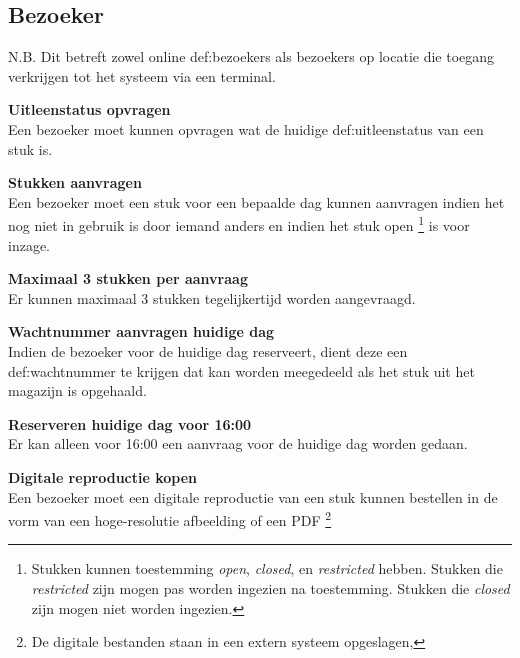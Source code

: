 \documentclass[a4paper,titlepage]{report}
\makeatletter
\def\nameddisplayedlabel#1#2{
  \label{#1}
  \begingroup
   \def\@currentlabel{#2}%
   \label{#1:name}\endgroup
   \textbf{#2}\hfill\\
}
\makeatother
\begin{document}
    \subsection{Bezoeker}
      N.B. Dit betreft zowel online \glspl{def:bezoeker} als bezoekers op locatie die
      toegang verkrijgen tot het systeem via een terminal.
      \begin{enumerate}[label={[F:\arabic*]}]
          \item\nameddisplayedlabel{f:status-opvragen}{Uitleenstatus opvragen}
            Een bezoeker moet kunnen opvragen wat de huidige
            \gls{def:uitleenstatus} van een stuk is.
          \item\nameddisplayedlabel{f:aanvragen}{Stukken aanvragen}
            Een bezoeker moet een stuk voor een bepaalde dag kunnen aanvragen
            indien het nog niet in gebruik is door iemand anders en indien het
            stuk open \footnote{Stukken kunnen toestemming \emph{open},
            \emph{closed}, en \emph{restricted} hebben. Stukken die
            \emph{restricted} zijn mogen pas worden ingezien na toestemming.
            Stukken die \emph{closed} zijn mogen niet worden ingezien.} is voor
            inzage. 
            \begin{enumerate}[label={[F:\arabic{enumi}\alph*]}]
              \item\nameddisplayedlabel{f:max-aantal-stukken}{Maximaal 3 stukken
              per aanvraag}
                Er kunnen maximaal 3 stukken tegelijkertijd worden aangevraagd.
              \item\nameddisplayedlabel{f:wachtnummertje}{Wachtnummer aanvragen
              huidige dag}
                Indien de bezoeker voor de huidige dag reserveert, dient deze
                een \gls{def:wachtnummer} te krijgen dat kan worden meegedeeld als
                het stuk uit het magazijn is opgehaald. 
              \item\nameddisplayedlabel{f:voor-16-reserveren}{Reserveren huidige
              dag voor 16:00}
                Er kan alleen voor 16:00 een aanvraag voor de huidige dag worden
                gedaan. 
            \end{enumerate}
          \item\nameddisplayedlabel{f:kopen}{Digitale reproductie kopen}
            Een bezoeker moet een digitale reproductie van een stuk kunnen bestellen in
            de vorm van een hoge-resolutie afbeelding of een PDF \footnote{
              De digitale bestanden staan in een extern systeem opgeslagen,
}
\end{enumerate}
\end{document}
